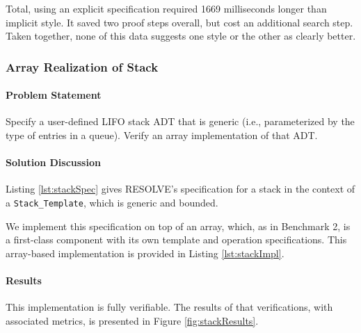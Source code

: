 Total, using an explicit specification required 1669 milliseconds longer than implicit style.  It saved two proof steps overall, but cost an additional search step.  Taken together, none of this data suggests one style or the other as clearly better.

		\subsubsection{Array Realization of Stack}	

\paragraph{Problem Statement}Specify a user-defined LIFO stack ADT that is generic (i.e., parameterized by the type of entries in a queue). Verify an array implementation of that ADT.

\paragraph{Solution Discussion}Listing \ref{lst:stackSpec} gives RESOLVE's specification for a stack in the context of a \texttt{Stack\_Template}, which is generic and bounded.



We implement this specification on top of an array, which, as in Benchmark 2, is a first-class component with its own template and operation specifications.  This array-based implementation is provided in Listing \ref{lst:stackImpl}.



\paragraph{Results}This implementation is fully verifiable.  The results of that verifications, with associated metrics, is presented in Figure \ref{fig:stackResults}.

